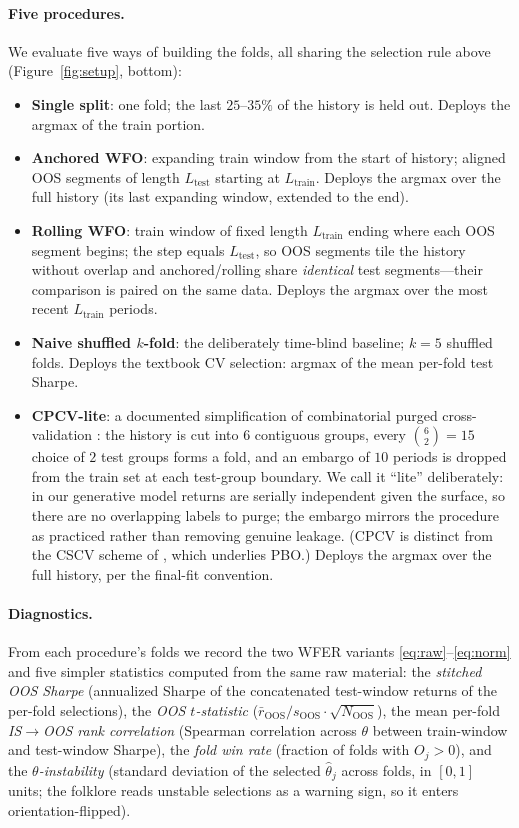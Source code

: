 \documentclass[11pt]{article}
\begin{document}
\paragraph{Five procedures.} We evaluate five ways of building the folds, all
sharing the selection rule above (Figure~\ref{fig:setup}, bottom):
\begin{itemize}\itemsep2pt
\item \textbf{Single split}: one fold; the last $25$--$35\%$ of the history is
held out. Deploys the argmax of the train portion.
\item \textbf{Anchored WFO}: expanding train window from the start of history;
aligned OOS segments of length $L_{\mathrm{test}}$ starting at
$L_{\mathrm{train}}$. Deploys the argmax over the full history (its last
expanding window, extended to the end).
\item \textbf{Rolling WFO}: train window of fixed length $L_{\mathrm{train}}$
ending where each OOS segment begins; the step equals $L_{\mathrm{test}}$, so
OOS segments tile the history without overlap and anchored/rolling share
\emph{identical} test segments---their comparison is paired on the same data.
Deploys the argmax over the most recent $L_{\mathrm{train}}$ periods.
\item \textbf{Naive shuffled $k$-fold}: the deliberately time-blind baseline;
$k=5$ shuffled folds. Deploys the textbook CV selection: argmax of the mean
per-fold test Sharpe.
\item \textbf{CPCV-lite}: a documented simplification of combinatorial purged
cross-validation \citep{lopezdeprado2018advances}: the history is cut into
$6$ contiguous groups, every $\binom{6}{2}=15$ choice of $2$ test groups
forms a fold, and an embargo of $10$ periods is dropped from the train set at
each test-group boundary. We call it ``lite'' deliberately: in our generative
model returns are serially independent given the surface, so there are no
overlapping labels to purge; the embargo mirrors the procedure as practiced
rather than removing genuine leakage. (CPCV is distinct from the CSCV scheme
of \citet{bailey2017probability}, which underlies PBO.) Deploys the argmax
over the full history, per the final-fit convention.
\end{itemize}

\paragraph{Diagnostics.} From each procedure's folds we record the two WFER
variants \eqref{eq:raw}--\eqref{eq:norm} and five simpler statistics computed
from the same raw material: the \emph{stitched OOS Sharpe} (annualized Sharpe
of the concatenated test-window returns of the per-fold selections), the
\emph{OOS $t$-statistic} ($\bar r_{\mathrm{OOS}}/s_{\mathrm{OOS}}\cdot
\sqrt{N_{\mathrm{OOS}}}$), the mean per-fold \emph{IS$\to$OOS rank
correlation} (Spearman correlation across $\theta$ between train-window and
test-window Sharpe), the \emph{fold win rate} (fraction of folds with
$O_j>0$), and the \emph{$\theta$-instability} (standard deviation of the
selected $\hat\theta_j$ across folds, in $[0,1]$ units; the folklore reads
unstable selections as a warning sign, so it enters orientation-flipped).
\end{document}
